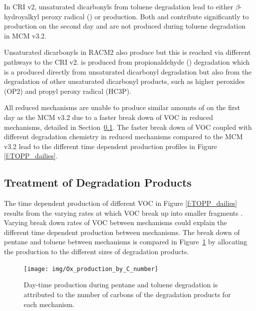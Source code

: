 In CRI v2, unsaturated dicarbonyls from toluene degradation lead to either $\beta$-hydroyalkyl peroxy radical () or  production.
Both  and  contribute significantly to  production on the second day and are not produced during toluene degradation in MCM v3.2.

Unsaturated dicarbonyls in RACM2 also produce  but this is reached via different pathways to the CRI v2.
 is produced from propionaldehyde () degradation which is a produced directly from unsaturated dicarbonyl degradation but also from the degradation of other unsaturated dicarbonyl products, such as higher peroxides (OP2) and propyl peroxy radical (HC3P).

All reduced mechanisms are unable to produce similar amounts of  on the first day as the MCM v3.2 due to a faster break down of VOC in reduced mechanisms, detailed in \mbox{Section \ref{ss:products}}.
The faster break down of VOC coupled with different degradation chemistry in reduced mechanisms compared to the MCM v3.2 lead to the different time dependent  production profiles in Figure \ref{f:TOPP_dailies}.


\subsection{Treatment of Degradation Products} \label{ss:products} 

The time dependent  production of different VOC in Figure \ref{f:TOPP_dailies} results from the varying rates at which VOC break up into smaller fragments \citep{Butler:2011}.
Varying break down rates of VOC between mechanisms could explain the different time dependent  production between mechanisms.
The break down of pentane and toluene between mechanisms is compared in \mbox{Figure \ref{f:carbon}} by allocating the  production to the different sizes of degradation products.

\begin{figure}
    \centering
    \texttt{[image: img/Ox\_production\_by\_C\_number]}
    \vspace{0mm}
    \caption{Day-time  production during pentane and toluene degradation is attributed to the number of carbons of the degradation products for each mechanism.}
    \vspace{-4mm}
    \label{f:carbon}
\end{figure}

